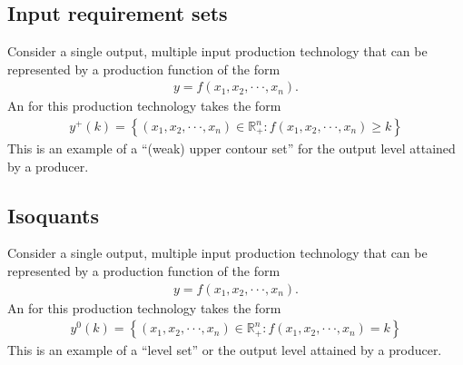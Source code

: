 \documentclass[letterpaper,10pt,english]{jupyterBook}
\begin{document}
\sphinxAtStartPar
{}


\subsection{Input requirement sets}
\label{\detokenize{02.sets_numbers_coordinates_distances:input-requirement-sets}}
\sphinxAtStartPar
Consider a single output, multiple input production technology that can be represented by a production function of the form
\begin{equation*}
\begin{split}y = f(x_1, x_2, · · · , x_n).\end{split}
\end{equation*}
\sphinxAtStartPar
An  for this production technology takes the form
\begin{equation*}
\begin{split}y^+(k) = 
\left\{(x_1, x_2, · · · , x_n) \in \mathbb{R}^n_+ : f (x_1, x_2, · · · , x_n) \geqslant k
\right\}\end{split}
\end{equation*}
\sphinxAtStartPar
This is an example of a “(weak) upper contour set” for the output level attained by a producer.

\sphinxAtStartPar
{}


\subsection{Isoquants}
\label{\detokenize{02.sets_numbers_coordinates_distances:isoquants}}
\sphinxAtStartPar
Consider a single output, multiple input production technology that can be represented by a production function of the form
\begin{equation*}
\begin{split}y = f(x_1, x_2, · · · , x_n).\end{split}
\end{equation*}
\sphinxAtStartPar
An  for this production technology takes the form
\begin{equation*}
\begin{split}y^0(k) = 
\left\{(x_1, x_2, · · · , x_n) \in \mathbb{R}^n_+ : f (x_1, x_2, · · · , x_n) = k 
\right\}\end{split}
\end{equation*}
\sphinxAtStartPar
This is an example of a “level set” or the output level attained by a producer.
\end{document}

